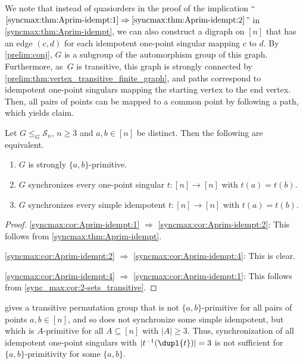 \begin{remark}
	We note that instead of quasiorders in the proof of 
	the implication ``$\ref{syncmax:thm:Aprim-idempt:1} \Rightarrow \ref{syncmax:thm:Aprim-idempt:2}$''
	in \cref{syncmax:thm:Aprim-idempt},
	we can also construct
	a digraph on $[n]$ 
	that has an edge $(c,d)$ for each idempotent one-point singular
	mapping $c$ to $d$.
	By \cref{prelim:conj}, $G$ is a subgroup of the automorphism group
	of this graph. Furthermore, as~$G$ is transitive, this graph is strongly connected by \cref{prelim:thm:vertex_transitive_finite_graph}, 
	and paths correspond
	to idempotent one-point singulars mapping the starting vertex
	to the end vertex. Then, all pairs of points can be mapped to a common point
	by following a path, 
	which yields claim.
\end{remark}

\begin{corollary} \label{syncmax:cor:Aprim-idempt} \label{sync_max:thm:idemp}
Let $G \le_G \mathcal S_n$, $n \ge 3$ and $a,b \in [n]$ be distinct. Then the following are equivalent.
\begin{enumerate}
\item \label{syncmax:cor:Aprim-idempt:1} $G$ is strongly $\{a,b\}$-primitive.

\item \label{syncmax:cor:Aprim-idempt:2} $G$ synchronizes every one-point singular $t \colon [n] \to [n]$ with
$t(a) = t(b)$.

\item \label{syncmax:cor:Aprim-idempt:4} $G$ synchronizes every simple idempotent $t \colon [n] \to [n]$ with $t(a) = t(b)$. 
\end{enumerate}
\end{corollary}
\begin{proof}
\ref{syncmax:cor:Aprim-idempt:1} $\Rightarrow$ \ref{syncmax:cor:Aprim-idempt:2}:
 This follows from \cref{syncmax:thm:Aprim-idempt}.

\ref{syncmax:cor:Aprim-idempt:2} $\Rightarrow$ \ref{syncmax:cor:Aprim-idempt:4}: This is clear.

\ref{syncmax:cor:Aprim-idempt:4} $\Rightarrow$ \ref{syncmax:cor:Aprim-idempt:1}: This follows from \cref{sync_max:cor:2-sets_transitive}.
\end{proof}

\begin{remark}
  gives a transitive permutation group that
 is not $\{a,b\}$-primitive for all pairs of points $a,b \in [n]$,
 and so does not synchronize some simple idempotent,
 but which is $A$-primitive for all $A \subseteq [n]$
 with $|A| \ge 3$.
 Thus, synchronization of all idempotent one-point singulars
 with $|t^{-1}(\dupl{t})| = 3$
 is not sufficient for $\{a,b\}$-primitivity for some $\{a,b\}$.	
\end{remark}

